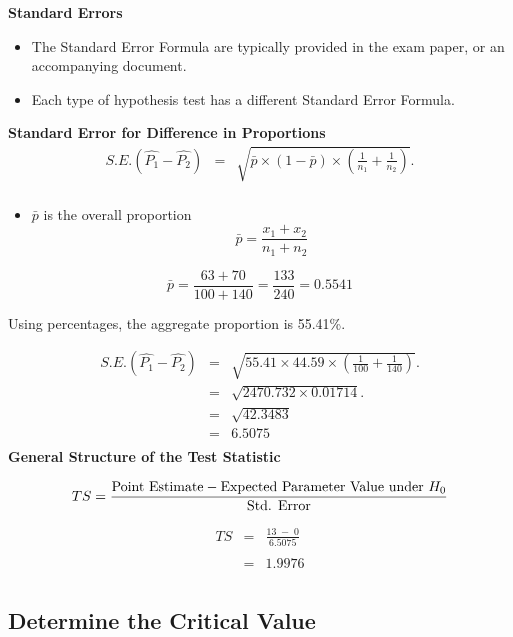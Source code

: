 \documentclass[a4paper,12pt]{article}
\begin{document}
\noindent \textbf{Standard Errors}
\begin{itemize}
    \item The Standard Error Formula are typically provided in the exam paper, or an accompanying document.
    \item Each type of hypothesis test has a different Standard Error Formula.
\end{itemize}
\bigskip
\begin{framed}
\noindent \textbf{Standard Error for Difference in Proportions}\\
\begin{eqnarray*}
	S.E.(\hat{P_1}-\hat{P_2})&=&\sqrt{ \bar{p}\times(1-\bar{p}) \times \left(\frac{1}{n_1}+\frac{1}{n_2}\right)}.\\
\end{eqnarray*}
\begin{itemize}
    \item $\bar{p}$ is the overall proportion
\[    \bar{p} = \frac{x_1 + x_2}{n_1+n_2}\]
\end{itemize}
\end{framed}
\[    \bar{p} = \frac{63 + 70}{100+140} = \frac{133}{240} = 0.5541 \]


\noindent Using percentages, the aggregate proportion is 55.41\%.

\begin{eqnarray*}
	S.E.(\hat{P_1}-\hat{P_2})&=&\sqrt{ 55.41 \times 44.59 \times \left(\frac{1}{100}+\frac{1}{140}\right)}.\\
	&=&\sqrt{ 2470.732 \times 0.01714}.\\
	&=&\sqrt{42.3483}\\
	&=& 6.5075 \\
\end{eqnarray*}
\newpage 
\noindent \textbf{General Structure of the Test Statistic}
\begin{framed}
\[ TS = {\mbox{Point Estimate} - \mbox{Expected Parameter Value under $H_{0}$} \over \mbox{Std. Error}}\]
\end{framed}

\begin{eqnarray*}
TS &=& \frac{ 13\;-\; 0}{6.5075} \\
& & \\
&=& 1.9976\\
\end{eqnarray*}
\newpage 
\subsection*{Determine the Critical Value}
\end{document}
